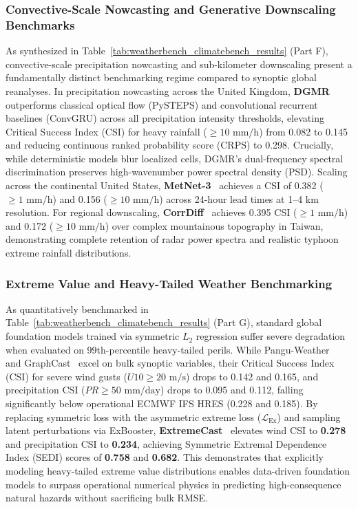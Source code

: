 \subsubsection{Convective-Scale Nowcasting and Generative Downscaling Benchmarks}
As synthesized in Table~\ref{tab:weatherbench_climatebench_results} (Part F), convective-scale precipitation nowcasting and sub-kilometer downscaling present a fundamentally distinct benchmarking regime compared to synoptic global reanalyses. In precipitation nowcasting across the United Kingdom, \textbf{DGMR}~\cite{ravuri2021dgmr} outperforms classical optical flow (PySTEPS) and convolutional recurrent baselines (ConvGRU) across all precipitation intensity thresholds, elevating Critical Success Index (CSI) for heavy rainfall ($\ge 10\text{ mm/h}$) from 0.082 to 0.145 and reducing continuous ranked probability score (CRPS) to 0.298. Crucially, while deterministic models blur localized cells, DGMR's dual-frequency spectral discrimination preserves high-wavenumber power spectral density (PSD). Scaling across the continental United States, \textbf{MetNet-3}~\cite{andrychowicz2023metnet3} achieves a CSI of 0.382 ($\ge 1\text{ mm/h}$) and 0.156 ($\ge 10\text{ mm/h}$) across 24-hour lead times at 1--4 km resolution. For regional downscaling, \textbf{CorrDiff}~\cite{mardani2023corrdiff} achieves 0.395 CSI ($\ge 1\text{ mm/h}$) and 0.172 ($\ge 10\text{ mm/h}$) over complex mountainous topography in Taiwan, demonstrating complete retention of radar power spectra and realistic typhoon extreme rainfall distributions.

\subsubsection{Extreme Value and Heavy-Tailed Weather Benchmarking}
As quantitatively benchmarked in Table~\ref{tab:weatherbench_climatebench_results} (Part G), standard global foundation models trained via symmetric $L_2$ regression suffer severe degradation when evaluated on 99th-percentile heavy-tailed perils. While Pangu-Weather~\cite{bi2023pangu} and GraphCast~\cite{lam2023graphcast} excel on bulk synoptic variables, their Critical Success Index (CSI) for severe wind gusts ($U10 \ge 20\text{ m/s}$) drops to 0.142 and 0.165, and precipitation CSI ($PR \ge 50\text{ mm/day}$) drops to 0.095 and 0.112, falling significantly below operational ECMWF IFS HRES (0.228 and 0.185). By replacing symmetric loss with the asymmetric extreme loss ($\mathcal{L}_{\text{Ex}}$) and sampling latent perturbations via ExBooster, \textbf{ExtremeCast}~\cite{xu2024extremecast} elevates wind CSI to \textbf{0.278} and precipitation CSI to \textbf{0.234}, achieving Symmetric Extremal Dependence Index (SEDI) scores of \textbf{0.758} and \textbf{0.682}. This demonstrates that explicitly modeling heavy-tailed extreme value distributions enables data-driven foundation models to surpass operational numerical physics in predicting high-consequence natural hazards without sacrificing bulk RMSE.

